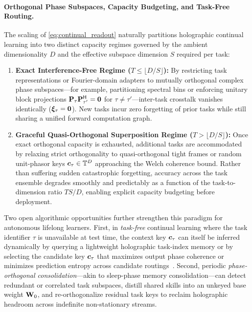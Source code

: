 \paragraph{Orthogonal Phase Subspaces, Capacity Budgeting, and Task-Free Routing.}
The scaling of \eqref{eq:continual_readout} naturally partitions holographic continual learning into two distinct capacity regimes governed by the ambient dimensionality $D$ and the effective subspace dimension $S$ required per task:
\begin{enumerate}
    \item \textbf{Exact Interference-Free Regime ($T \le \lfloor D/S \rfloor$):}
    By restricting task representations or Fourier-domain adapters to mutually orthogonal complex phase subspaces---for example, partitioning spectral bins or enforcing unitary block projections $\mathbf{P}_\tau \mathbf{P}_{\tau'}^{\mathsf{H}} = \mathbf{0}$ for $\tau \neq \tau'$---inter-task crosstalk vanishes identically ($\boldsymbol{\xi}_\tau = \boldsymbol{0}$).
    New tasks incur zero forgetting of prior tasks while still sharing a unified forward computation graph.
    \item \textbf{Graceful Quasi-Orthogonal Superposition Regime ($T > \lfloor D/S \rfloor$):}
    Once exact orthogonal capacity is exhausted, additional tasks are accommodated by relaxing strict orthogonality to quasi-orthogonal tight frames or random unit-phasor keys $\boldsymbol{c}_\tau \in \mathbb{T}^D$ approaching the Welch coherence bound.
    Rather than suffering sudden catastrophic forgetting, accuracy across the task ensemble degrades smoothly and predictably as a function of the task-to-dimension ratio $T S / D$, enabling explicit capacity budgeting before deployment.
\end{enumerate}

Two open algorithmic opportunities further strengthen this paradigm for autonomous lifelong learners.
First, in \emph{task-free} continual learning where the task identifier $\tau$ is unavailable at test time, the context key $\boldsymbol{c}_\tau$ can itself be inferred dynamically by querying a lightweight holographic task-index memory or by selecting the candidate key $\boldsymbol{c}_\tau$ that maximizes output phase coherence or minimizes prediction entropy across candidate routings~\cite{HOLOGRAPHIC_CONTINUAL_LEARNING}.
Second, periodic \emph{phase-orthogonal consolidation}---akin to sleep-phase memory consolidation---can detect redundant or correlated task subspaces, distill shared skills into an unkeyed base weight $\mathbf{W}_0$, and re-orthogonalize residual task keys to reclaim holographic headroom across indefinite non-stationary streams.

